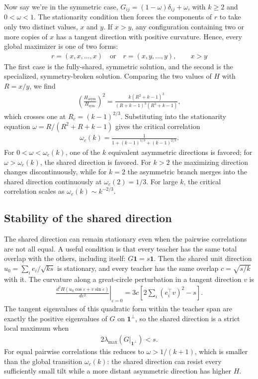 \documentclass[midterm]{sparreport}
\theoremstyle{definition}
\begin{document}
Now say we're in the symmetric case, $G_{ij} = (1-\omega)\delta_{ij} + \omega$, with $k \geq 2$ and $0 < \omega < 1$.
The stationarity condition then forces the components of $r$ to take only two distinct values, $x$ and $y$.
If $x > y$, any configuration containing two or more copies of $x$ has a tangent direction with positive curvature.
Hence, every global maximizer is one of two forms:
\begin{align*}
    r = (x, x, \dots, x)
    \quad \text{or} \quad
    r = (x, y, \dots, y),
    \qquad x > y
\end{align*}
The first case is the fully-shared, symmetric solution, and the second is the specialized, symmetry-broken solution.
Comparing the two values of $H$ with $R = x/y$, we find
\begin{align*}
    \left(\frac{H_\text{asym}}{H_\text{sym}}\right)^2
    =\frac{k(R^2+k-1)^3}{(R+k-1)^3(R^3+k-1)},
\end{align*}
which crosses one at $R_c = (k-1)^{2/3}$.
Substituting into the stationarity equation $\omega = R/(R^2+R+k-1)$ gives the critical correlation
\begin{align*}
    \boxed{\omega_c(k) = \frac{1}{1+(k-1)^{1/3}+(k-1)^{2/3}}.}
\end{align*}
For $0<\omega<\omega_c(k)$, one of the $k$ equivalent asymmetric directions is favored; for $\omega>\omega_c(k)$, the shared direction is favored.
For $k>2$ the maximizing direction changes discontinuously, while for $k=2$ the asymmetric branch merges into the shared direction continuously at $\omega_c(2)=1/3$.
For large $k$, the critical correlation scales as $\omega_c(k)\sim k^{-2/3}$.

\subsection{Stability of the shared direction}

The shared direction can remain stationary even when the pairwise correlations are not all equal.
A useful condition is that every teacher has the same total overlap with the others, including itself: $G\mathbf 1 = s\mathbf 1$.
Then the shared unit direction $u_0 = \sum_i e_i/\sqrt{ks}$ is stationary, and every teacher has the same overlap $c = \sqrt{s/k}$ with it.
The curvature along a great-circle perturbation in a tangent direction $v$ is
\begin{align*}
    \left.\frac{d^2H(u_0\cos\varepsilon + v\sin\varepsilon)}{d\varepsilon^2}\right|_{\varepsilon=0}
    =3c\left[2\sum_i(e_i^\top v)^2-s\right].
\end{align*}
The tangent eigenvalues of this quadratic form within the teacher span are exactly the positive eigenvalues of $G$ on $\mathbf 1^\perp$, so the shared direction is a strict local maximum when
\begin{align*}
    \boxed{2\lambda_{\max}\!\left(G\big|_{\mathbf 1^\perp}\right)<s.}
\end{align*}
For equal pairwise correlations this reduces to $\omega > 1/(k+1)$, which is smaller than the global transition $\omega_c(k)$: the shared direction can resist every sufficiently small tilt while a more distant asymmetric direction has higher $H$.
\end{document}

